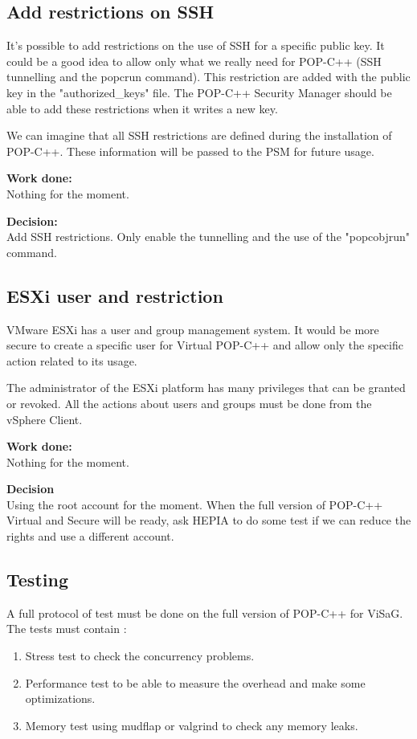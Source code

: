 \subsection{Add restrictions on SSH}
It's possible to add restrictions on the use of SSH for a specific public key. It could be a good idea to allow only what we really need for POP-C++ (SSH tunnelling and the popcrun command). This restriction are added with the public key in the "authorized\_keys" file. The POP-C++ Security Manager should be able to add these restrictions when it writes a new key. \s

We can imagine that all SSH restrictions are defined during the installation of POP-C++. These information will be passed to the PSM for future usage.\s

\textbf{Work done:}\\
Nothing for the moment.\s

\textbf{Decision:}\\
Add SSH restrictions. Only enable the tunnelling and the use of the "popcobjrun" command.

\subsection{ESXi user and restriction}
VMware ESXi has a user and group management system. It would be more secure to create a specific user for Virtual POP-C++ and allow only the specific action related to its usage. \s

The administrator of the ESXi platform has many privileges that can be granted or revoked. All the actions about users and groups must be done from the vSphere Client. \s

\textbf{Work done:}\\
Nothing for the moment.\s

\textbf{Decision}\\
Using the root account for the moment. When the full version of POP-C++ Virtual and Secure will be ready, ask HEPIA to do some test if we can reduce the rights and use a different account.

\subsection{Testing}
A full protocol of test must be done on the full version of POP-C++ for ViSaG. The tests must contain : 
\begin{enumerate}
\item Stress test to check the concurrency problems.
\item Performance test to be able to measure the overhead and make some optimizations. 
\item Memory test using mudflap or valgrind to check any memory leaks. 
\end{enumerate}

